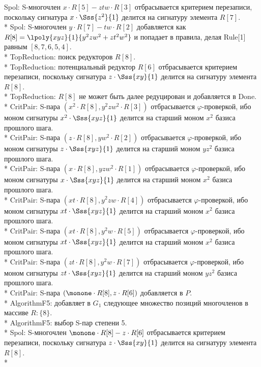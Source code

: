 Spol: S-многочлен $x\cdot R[5] - ztw\cdot R[3]$ отбрасывается критерием перезаписи, поскольку сигнатура $x\cdot\Sss{z^{2}}{1}$ делится на сигнатуру элемента $R[7]$.\\*
Spol: S-многочлен $y\cdot R[7] - tw\cdot R[2]$ добавляется как $R[8]=\lpoly{xyz}{1}{y^{2}zw^{2}+zt^{2}w^{2}}$ и попадает в правила, делая Rule[1] равным $[8, 7, 6, 5, 4]$.\\*
TopReduction: поиск редукторов $R[8]$.\\*
TopReduction: потенциальный редуктор $R[6]$ отбрасывается критерием перезаписи, поскольку сигнатура $z\cdot\Sss{xy}{1}$ делится на сигнатуру элемента $R[8]$.\\*
TopReduction: $R[8]$ не может быть далее редуцирован и добавляется в Done.\\*
CritPair: S-пара $(x^{2}\cdot R[8],y^{2}zw^{2}\cdot R[3])$  отбрасывается $\varphi$-проверкой, ибо моном сигнатуры $x^{2}\cdot\Sss{xyz}{1}$ делится на старший моном $x^{2}$ базиса прошлого шага.\\*
CritPair: S-пара $(z\cdot R[8],yw^{2}\cdot R[2])$  отбрасывается $\varphi$-проверкой, ибо моном сигнатуры $z\cdot\Sss{xyz}{1}$ делится на старший моном $yz^{2}$ базиса прошлого шага.\\*
CritPair: S-пара $(x\cdot R[8],yzw^{2}\cdot R[1])$  отбрасывается $\varphi$-проверкой, ибо моном сигнатуры $x\cdot\Sss{xyz}{1}$ делится на старший моном $x^{2}$ базиса прошлого шага.\\*
CritPair: S-пара $(xt\cdot R[8],y^{2}zw\cdot R[4])$  отбрасывается $\varphi$-проверкой, ибо моном сигнатуры $xt\cdot\Sss{xyz}{1}$ делится на старший моном $x^{2}$ базиса прошлого шага.\\*
CritPair: S-пара $(xt\cdot R[8],y^{2}w\cdot R[5])$  отбрасывается $\varphi$-проверкой, ибо моном сигнатуры $xt\cdot\Sss{xyz}{1}$ делится на старший моном $x^{2}$ базиса прошлого шага.\\*
CritPair: S-пара $(zt\cdot R[8],y^{2}w\cdot R[7])$  отбрасывается $\varphi$-проверкой, ибо моном сигнатуры $zt\cdot\Sss{xyz}{1}$ делится на старший моном $yz^{2}$ базиса прошлого шага.\\*
CritPair: S-пара $(\monone\cdot R[8],z\cdot R[6])$ добавляется в $P$.\\*
AlgorithmF5: добавляет в $G_{1}$ следующее множество позиций многочленов в массиве $R: \{8\}$.\\*
AlgorithmF5: выбор S-пар степени 5.\\*
Spol: S-многочлен $\monone\cdot R[8] - z\cdot R[6]$ отбрасывается критерием перезаписи, поскольку сигнатура $z\cdot\Sss{xy}{1}$ делится на сигнатуру элемента $R[8]$.\\*
